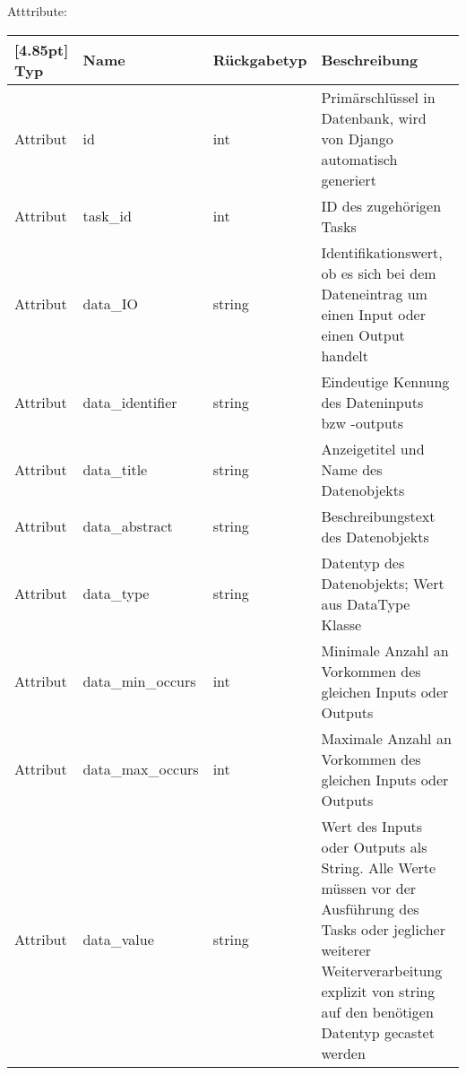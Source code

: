 	         Atttribute:
	         \begin{center}
	         	\setlength\tabcolsep{5pt}
	         	\renewcommand{\arraystretch}{1.5}
	         	
	         	\begin{tabularx}{\textwidth}{|l|l|l|X|}
	         		\hline
	         		\rowcolor[gray]{0.75}[4.85pt]
	         		Typ & Name & Rückgabetyp & Beschreibung \\ \hline 
	         		Attribut & id & int & Primärschlüssel in Datenbank, wird von Django automatisch generiert \\ \hline
	         		Attribut & task\_id & int & ID des zugehörigen Tasks\\ \hline
	         		Attribut & data\_IO & string & Identifikationswert, ob es sich bei dem Dateneintrag um einen Input oder einen Output handelt\\ \hline
	         		Attribut & data\_identifier & string & Eindeutige Kennung des Dateninputs bzw -outputs\\ \hline
	         		Attribut & data\_title & string & Anzeigetitel und Name des Datenobjekts\\ \hline
	         		Attribut & data\_abstract & string & Beschreibungstext des Datenobjekts\\ \hline
	         		Attribut & data\_type & string & Datentyp des Datenobjekts; Wert aus DataType Klasse \\ \hline
	         		Attribut & data\_min\_occurs & int & Minimale Anzahl an Vorkommen des gleichen Inputs oder Outputs \\ \hline
	         		Attribut & data\_max\_occurs & int & Maximale Anzahl an Vorkommen des gleichen Inputs oder Outputs \\ \hline
	         		Attribut & data\_value & string & Wert des Inputs oder Outputs als String. Alle Werte müssen vor der Ausführung des Tasks oder jeglicher weiterer Weiterverarbeitung explizit von string auf den benötigen Datentyp gecastet werden\\
	         		\hline
	         	\end{tabularx}
	         \end{center}
            
